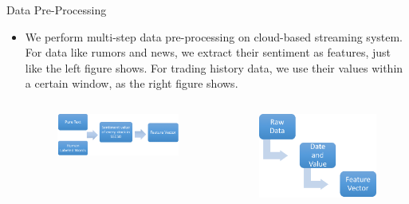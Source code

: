 \documentclass[final,hyperref={pdfpagelabels=false}]{beamer}
\begin{document}
\begin{frame}[t]
\begin{columns}[t]
\begin{column}{.445\textwidth}
\begin{block}{Data Pre-Processing}
\begin{itemize}
\item We perform multi-step data pre-processing on cloud-based streaming system. For data like rumors and news, we extract their sentiment as features, just like the left figure shows. For trading history data, we use their values within a certain window, as the right figure shows. 
\begin{columns} %
\begin{column}{.4\textwidth} 
	\begin{figure}
		\includegraphics[width=1.2\linewidth]{textdata.png}
		\label{text}
	\end{figure}
\end{column}
\begin{column}{.4\textwidth} 
	\begin{figure}
		\includegraphics[width=0.8\linewidth]{numdata.png}
		\label{num}
	\end{figure}
\end{column}
\end{columns}

\end{itemize}
\end{block}


\end{column} %


\end{columns}
\end{frame}
\end{document}
